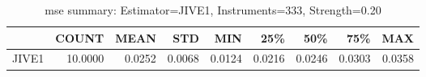 \begin{table}[ht]
\centering
\caption{mse summary: Estimator=JIVE1, Instruments=333, Strength=0.20}
\begin{tabular}{lrrrrrrrr}
\toprule
 & COUNT & MEAN & STD & MIN & 25\% & 50\% & 75\% & MAX \\
\midrule
JIVE1 & 10.0000 & 0.0252 & 0.0068 & 0.0124 & 0.0216 & 0.0246 & 0.0303 & 0.0358 \\
\bottomrule
\end{tabular}
\end{table}
